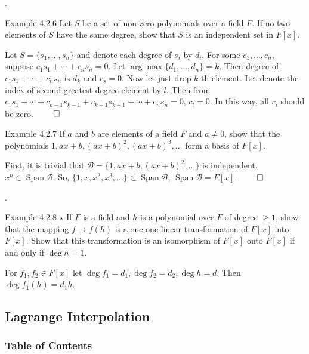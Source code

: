 \documentclass[8pt]{beamer}
\newcommand{\mc}[1]{\mathcal{#1}}
\newcommand{\Span}{\operatorname{Span}}
\begin{document}
\begin{frame}{.}
    \begin{block}{Example 4.2.6}
        Let $S$ be a set of non-zero polynomials over a field $F$.
        If no two elements of $S$ have the same degree, show that $S$ is an independent set in $F[x]$.
    \end{block}
    Let $S =\{s_1, \dots , s_n \}$ and denote each degree of $s_i$ by $d_i$.
    For some $c_1, \dots, c_n$, suppose $c_1 s_1 + \cdots + c_n s_n = 0$.
    Let $\arg \max \{d_1, \dots, d_n\} = k$.
    Then degree of $c_1 s_1 + \cdots + c_n s_n$ is $d_k$ and $c_s = 0$.
    Now let just drop $k$-th element.
    Let denote the index of second greatest degree element by $l$.
    Then from $c_1 s_1 + \cdots +c_{k-1} s_{k-1} + c_{k+1} s_{k+1} + \cdots + c_n s_n=0$, $c_l = 0$.
    In this way, all $c_i$ should be zero.
    $\qed$

    \begin{block}{Example 4.2.7}
        If $a$ and $b$ are elements of a field $F$ and $a \neq 0$, show that the polynomials $1, ax+b, (ax+b)^2, (ax+b)^3, \dots$ form a basis of $F[x]$.
    \end{block}

    First, it is trivial that $\mc{B} = \{1, ax+b, (ax+b)^2, \dots \}$ is independent.
    $x^n \in \Span \mc{B}$.
    So, $\{1, x, x^2, x^3, \dots\} \subset \Span \mc{B}$, $\Span \mc{B} =F[x]$.
    $\qed$
\end{frame}

\begin{frame}{.}
    \begin{block}{Example 4.2.8 $\star$}
        If $F$ is a field and $h$ is a polynomial over $F$ of degree $\geq 1$, show that the mapping $f \to f(h)$ is a one-one linear transformation of $F[x]$ into $F[x]$.
        Show that this transformation is an isomorphism of $F[x]$ onto $F[x]$ if and only if $\deg h = 1$.
    \end{block}

    For $f_1, f_2 \in F[x]$ let $\deg f_1 = d_1, \deg f_2 = d_2, \deg h = d$.
    Then $\deg f_1(h) = d_1 h$.
\end{frame}

\subsection{Lagrange Interpolation}

\begingroup
    \begin{frame}
        \frametitle{Table of Contents}
        \tableofcontents[currentsubsection]
    \end{frame}
\endgroup
\end{document}
